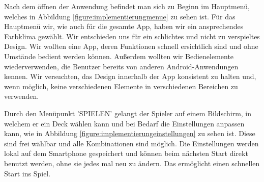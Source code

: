 Nach dem öffnen der Anwendung befindet man sich zu Beginn im Hauptmenü, welches in Abbildung \ref{figure:implementierungmenue} zu sehen ist. Für das Hauptmenü wir, wie auch für die gesamte App, haben wir ein ansprechendes Farbklima gewählt. Wir entschieden uns für ein schlichtes und nicht zu verspieltes Design. Wir wollten eine App, deren Funktionen schnell ersichtlich sind und ohne Umstände bedient werden können. Außerdem wollten wir Bedienelemente wiederverwenden, die Benutzer bereits von anderen Android-Anwendungen kennen. Wir versuchten, das Design innerhalb der App konsistent zu halten und, wenn möglich, keine verschiedenen Elemente in verschiedenen Bereichen zu verwenden.

Durch den Menüpunkt 'SPIELEN' gelangt der Spieler auf einem Bildschirm, in welchem er ein Deck wählen kann und bei Bedarf die Einstellungen anpassen kann, wie in Abbildung \ref{figure:implementierungeinstellungen} zu sehen ist. Diese sind frei wählbar und alle Kombinationen sind möglich. Die Einstellungen werden lokal auf dem Smartphone gespeichert und können beim nächsten Start direkt benutzt werden, ohne sie jedes mal neu zu ändern. Das ermöglicht einen schnellen Start ins Spiel.\\

